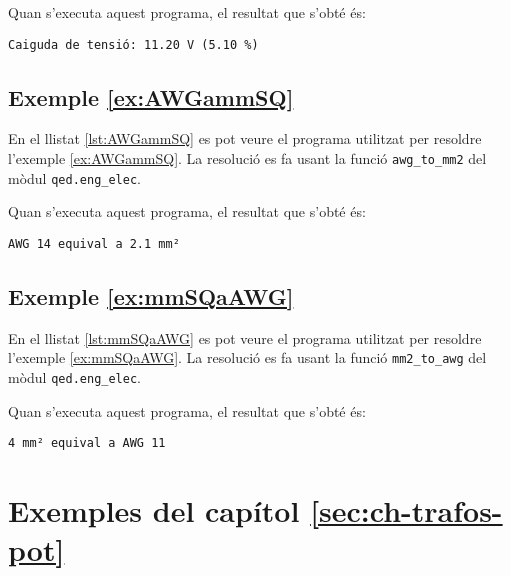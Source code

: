 Quan s'executa aquest programa, el resultat que s'obté és:
\lstset{
	language=,
	numbers=none,
	frame=none
}
\begin{lstlisting}
Caiguda de tensió: 11.20 V (5.10 %)
\end{lstlisting} 



\hypertarget{exemple:AWGammSQ}{\subsection{Exemple \ref*{ex:AWGammSQ} \AWGammSQ}}
En el llistat \vref{lst:AWGammSQ} es pot veure el programa utilitzat per resoldre l'exemple \vref{ex:AWGammSQ}. La resolució es fa usant la funció \texttt{awg\_to\_mm2} del mòdul \texttt{qed.eng\_elec}.


Quan s'executa aquest programa, el resultat que s'obté és:
\lstset{
	language=,
	numbers=none,
	frame=none
}
\begin{lstlisting}
AWG 14 equival a 2.1 mm²
\end{lstlisting} 



\hypertarget{exemple:mmSQaAWG}{\subsection{Exemple \ref*{ex:mmSQaAWG} \mmSQaAWG}}
En el llistat \vref{lst:mmSQaAWG} es pot veure el programa utilitzat per resoldre l'exemple \vref{ex:mmSQaAWG}. La resolució es fa usant la funció \texttt{mm2\_to\_awg} del mòdul \texttt{qed.eng\_elec}.


Quan s'executa aquest programa, el resultat que s'obté és:
\lstset{
	language=,
	numbers=none,
	frame=none
}
\begin{lstlisting}
4 mm² equival a AWG 11
\end{lstlisting} 





\section{Exemples del capítol \ref*{sec:ch-trafos-pot}}

